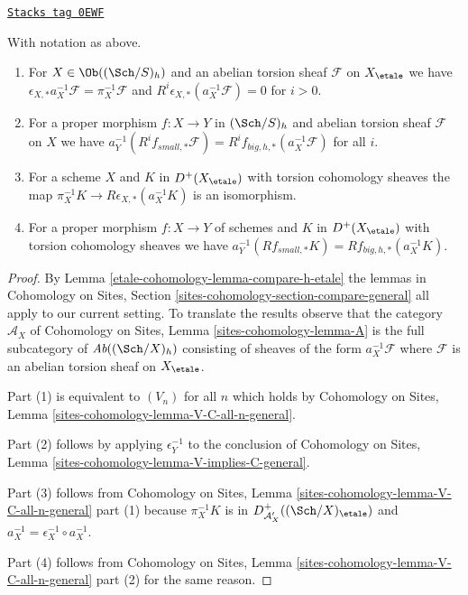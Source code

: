 \begin{lemma}
\label{etale-cohomology-lemma-V-C-all-n-etale-h}
\href{https://stacks.math.columbia.edu/tag/0EWF}{\texttt{Stacks tag 0EWF}}

With notation as above.
\begin{enumerate}
\item For $X \in \Ob((\Sch/S)_{h})$ and an abelian torsion sheaf $\mathcal{F}$
on $X_\etale$ we have
$\epsilon_{X, *}a_X^{-1}\mathcal{F} = \pi_X^{-1}\mathcal{F}$
and $R^i\epsilon_{X, *}(a_X^{-1}\mathcal{F}) = 0$ for $i > 0$.
\item For a proper morphism $f : X \to Y$ in $(\Sch/S)_h$
and abelian torsion sheaf $\mathcal{F}$ on $X$ we have
$a_Y^{-1}(R^if_{small, *}\mathcal{F}) =
R^if_{big, h, *}(a_X^{-1}\mathcal{F})$
for all $i$.
\item For a scheme $X$ and $K$ in $D^+(X_\etale)$ with torsion
cohomology sheaves the map
$\pi_X^{-1}K \to R\epsilon_{X, *}(a_X^{-1}K)$ is an isomorphism.
\item For a proper morphism $f : X \to Y$ of schemes
and $K$ in $D^+(X_\etale)$ with torsion cohomology sheaves we have
$a_Y^{-1}(Rf_{small, *}K) = Rf_{big, h, *}(a_X^{-1}K)$.
\end{enumerate}
\end{lemma}

\begin{proof}
By Lemma \ref{etale-cohomology-lemma-compare-h-etale} the lemmas in
Cohomology on Sites, Section \ref{sites-cohomology-section-compare-general}
all apply to our current setting. To translate the results
observe that the category $\mathcal{A}_X$ of
Cohomology on Sites, Lemma \ref{sites-cohomology-lemma-A}
is the full subcategory of $\textit{Ab}((\Sch/X)_h)$
consisting of sheaves of the form $a_X^{-1}\mathcal{F}$
where $\mathcal{F}$ is an abelian torsion sheaf on $X_\etale$.

\medskip\noindent
Part (1) is equivalent to $(V_n)$ for all $n$ which holds by
Cohomology on Sites, Lemma \ref{sites-cohomology-lemma-V-C-all-n-general}.

\medskip\noindent
Part (2) follows by applying $\epsilon_Y^{-1}$ to the conclusion of
Cohomology on Sites, Lemma \ref{sites-cohomology-lemma-V-implies-C-general}.

\medskip\noindent
Part (3) follows from Cohomology on Sites, Lemma
\ref{sites-cohomology-lemma-V-C-all-n-general} part (1)
because $\pi_X^{-1}K$ is in $D^+_{\mathcal{A}'_X}((\Sch/X)_\etale)$
and $a_X^{-1} = \epsilon_X^{-1} \circ a_X^{-1}$.

\medskip\noindent
Part (4) follows from Cohomology on Sites, Lemma
\ref{sites-cohomology-lemma-V-C-all-n-general} part (2)
for the same reason.
\end{proof}

